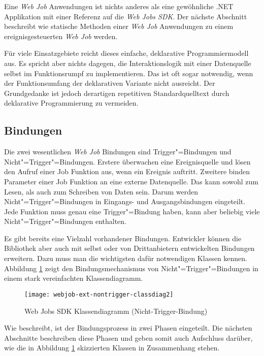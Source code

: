 Eine \textit{Web Job} Anwendungen ist nichts anderes als eine gewöhnliche .NET Applikation mit einer Referenz auf die \textit{Web Jobs SDK}. Der nächste Abschnitt beschreibt wie statische Methoden einer \textit{Web Job} Anwendungen zu einem ereignisgesteuerten \textit{Web Job} werden.

Für viele Einsatzgebiete reicht dieses einfache, deklarative Programmiermodell aus. Es spricht aber nichts dagegen, die Interaktionslogik mit einer Datenquelle selbst im Funktionsrumpf zu implementieren. Das ist oft sogar notwendig, wenn der Funktionsumfang der deklarativen Variante nicht ausreicht. Der Grundgedanke ist jedoch derartigen repetitiven Standardquelltext durch deklarative Programmierung zu vermeiden.

\subsection{Bindungen}

Die zwei wesentlichen \textit{Web Job} Bindungen sind Trigger"=Bindungen und Nicht"=Trigger"=Bindungen. Erstere überwachen eine Ereignisquelle und lösen den Aufruf einer Job Funktion aus, wenn ein Ereignis auftritt. Zweitere binden Parameter einer Job Funktion an eine externe Datenquelle. Das kann sowohl zum Lesen, als auch zum Schreiben von Daten sein. Darum werden Nicht"=Trigger"=Bindungen in Eingangs- und Ausgangsbindungen eingeteilt. Jede Funktion muss genau eine Trigger"=Bindung haben, kann aber beliebig viele Nicht"=Trigger"=Bindungen enthalten.

Es gibt bereits eine Vielzahl vorhandener Bindungen. Entwickler können die Bibliothek aber auch mit selbst oder von Drittanbietern entwickelten Bindungen erweitern. Dazu muss man die wichtigsten dafür notwendigen Klassen kennen. Abbildung \ref{fig:webjobsclassdiag} zeigt den Bindungsmechanismus von Nicht"=Trigger"=Bindungen in einem stark vereinfachten Klassendiagramm.

\begin{figure}[!hbt]%
\texttt{[image: webjob-ext-nontrigger-classdiag2]}%
\caption{Web Jobs SDK Klassendiagramm (Nicht-Trigger-Bindung)}%
\label{fig:webjobsclassdiag}%
\end{figure}

Wie \cite{WebJobsSdkBindingProcess} beschreibt, ist der Bindungsprozess in zwei Phasen eingeteilt. Die nächsten Abschnitte beschreiben diese Phasen und geben somit auch Aufschluss darüber, wie die in Abbildung \ref{fig:webjobsclassdiag} skizzierten Klassen in Zusammenhang stehen.

